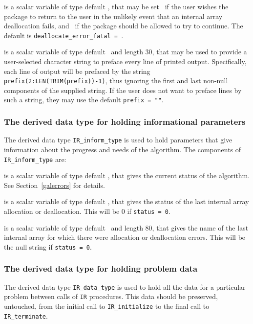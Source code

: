 \documentclass{galahad}
\newcommand{\packagename}{IR}
\begin{document}
\begin{description}
 is a scalar variable of type default \logical,
that may be set \true\ if the user wishes the package to return to the user
in the unlikely event that an internal array deallocation fails,
and \false\ if the package should be allowed to try to continue.
The default is {\tt deallocate\_error\_fatal = \false}.

 is a scalar variable of type default \character\
and length 30, that may be used to provide a user-selected
character string to preface every line of printed output.
Specifically, each line of output will be prefaced by the string
{\tt prefix(2:LEN(TRIM(prefix))-1)},
thus ignoring the first and last non-null components of the
supplied string. If the user does not want to preface lines by such
a string, they may use the default {\tt prefix = ""}.

\end{description}


\subsubsection{The derived data type for holding informational
 parameters}\label{typeinform}
The derived data type
{\tt \packagename\_inform\_type}
is used to hold parameters that give information about the progress and needs
of the algorithm. The components of
{\tt \packagename\_inform\_type}
are:

\begin{description}
 is a scalar variable of type default \integer, that gives the
current status of the algorithm. See Section~\ref{galerrors} for details.

 is a scalar variable of type default \integer,
that gives the status of the last internal array allocation
or deallocation. This will be 0 if {\tt status = 0}.

 is a scalar variable of type default \character\
and length 80, that  gives the name of the last internal array
for which there were allocation or deallocation errors.
This will be the null string if {\tt status = 0}.

\end{description}


\subsubsection{The derived data type for holding problem data}\label{typedata}
The derived data type
{\tt \packagename\_data\_type}
is used to hold all the data for a particular problem between calls of
{\tt \packagename} procedures.
This data should be preserved, untouched, from the initial call to
{\tt \packagename\_initialize}
to the final call to
{\tt \packagename\_terminate}.
\end{document}
